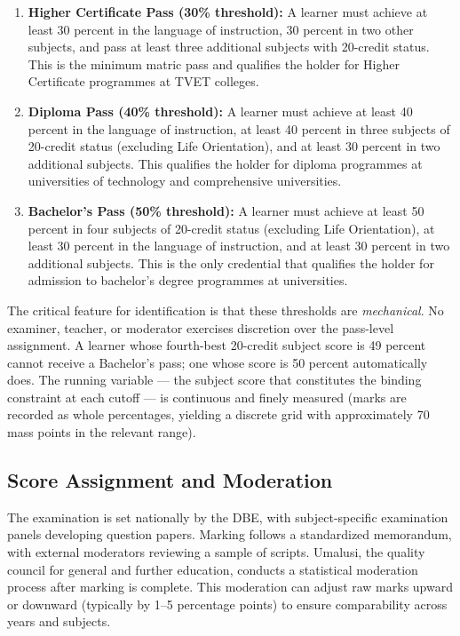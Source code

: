 \documentclass[12pt]{article}
\begin{document}
\begin{enumerate}
    \item \textbf{Higher Certificate Pass (30\% threshold):} A learner must achieve at least 30 percent in the language of instruction, 30 percent in two other subjects, and pass at least three additional subjects with 20-credit status. This is the minimum matric pass and qualifies the holder for Higher Certificate programmes at TVET colleges.

    \item \textbf{Diploma Pass (40\% threshold):} A learner must achieve at least 40 percent in the language of instruction, at least 40 percent in three subjects of 20-credit status (excluding Life Orientation), and at least 30 percent in two additional subjects. This qualifies the holder for diploma programmes at universities of technology and comprehensive universities.

    \item \textbf{Bachelor's Pass (50\% threshold):} A learner must achieve at least 50 percent in four subjects of 20-credit status (excluding Life Orientation), at least 30 percent in the language of instruction, and at least 30 percent in two additional subjects. This is the only credential that qualifies the holder for admission to bachelor's degree programmes at universities.
\end{enumerate}

The critical feature for identification is that these thresholds are \emph{mechanical}. No examiner, teacher, or moderator exercises discretion over the pass-level assignment. A learner whose fourth-best 20-credit subject score is 49 percent cannot receive a Bachelor's pass; one whose score is 50 percent automatically does. The running variable --- the subject score that constitutes the binding constraint at each cutoff --- is continuous and finely measured (marks are recorded as whole percentages, yielding a discrete grid with approximately 70 mass points in the relevant range).

\subsection{Score Assignment and Moderation}

The examination is set nationally by the DBE, with subject-specific examination panels developing question papers. Marking follows a standardized memorandum, with external moderators reviewing a sample of scripts. Umalusi, the quality council for general and further education, conducts a statistical moderation process after marking is complete. This moderation can adjust raw marks upward or downward (typically by 1--5 percentage points) to ensure comparability across years and subjects.
\end{document}
